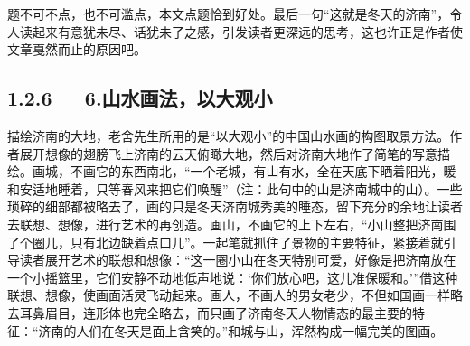 \documentclass[letterpaper,12pt,english]{sphinxmanual}
\begin{document}
题不可不点，也不可滥点，本文点题恰到好处。最后一句“这就是冬天的济南”，令人读起来有意犹未尽、话犹未了之感，引发读者更深远的思考，这也许正是作者使文章戛然而止的原因吧。


\subsection{1.2.6   6.山水画法，以大观小}
\label{\detokenize{p01_u6563_u6587/_u8001_u820d-_u6d4e_u5357_u7684_u51ac_u5929:id10}}
描绘济南的大地，老舍先生所用的是“以大观小”的中国山水画的构图取景方法。作者展开想像的翅膀飞上济南的云天俯瞰大地，然后对济南大地作了简笔的写意描绘。画城，不画它的东西南北，“一个老城，有山有水，全在天底下晒着阳光，暖和安适地睡着，只等春风来把它们唤醒”（注：此句中的山是济南城中的山）。一些琐碎的细部都被略去了，画的只是冬天济南城秀美的睡态，留下充分的余地让读者去联想、想像，进行艺术的再创造。画山，不画它的上下左右，“小山整把济南围了个圈儿，只有北边缺着点口儿”。一起笔就抓住了景物的主要特征，紧接着就引导读者展开艺术的联想和想像：“这一圈小山在冬天特别可爱，好像是把济南放在一个小摇篮里，它们安静不动地低声地说：‘你们放心吧，这儿准保暖和。’”借这种联想、想像，使画面活灵飞动起来。画人，不画人的男女老少，不但如国画一样略去耳鼻眉目，连形体也完全略去，而只画了济南冬天人物情态的最主要的特征：“济南的人们在冬天是面上含笑的。”和城与山，浑然构成一幅完美的图画。
\end{document}
